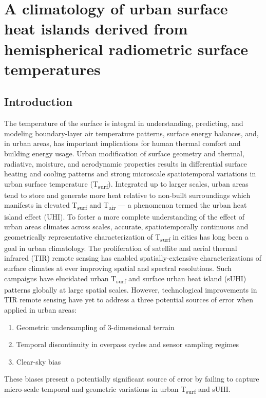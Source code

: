\chapter{A climatology of urban surface heat islands derived from hemispherical radiometric surface temperatures}

\section{Introduction}

The temperature of the surface is integral in understanding, predicting, and modeling boundary-layer air temperature patterns, surface energy balances, and, in urban areas, has important implications for human thermal comfort and building energy usage. Urban modification of surface geometry and thermal, radiative, moisture, and aerodynamic properties results in differential surface heating and cooling patterns and strong microscale spatiotemporal variations in urban surface temperature (T\textsubscript{surf}). Integrated up to larger scales, urban areas tend to store and generate more heat relative to non-built surroundings which manifests in elevated T\textsubscript{surf} and T\textsubscript{air} --- a phenomenon termed the urban heat island effect (UHI). To foster a more complete understanding of the effect of urban areas climates across scales, accurate, spatiotemporally continuous and geometrically representative characterization of T\textsubscript{surf} in cities has long been a goal in urban climatology. The proliferation of satellite and aerial thermal infrared (TIR) remote sensing has enabled spatially-extensive characterizations of surface climates at ever improving spatial and spectral resolutions. Such campaigns have elucidated urban T\textsubscript{surf} and surface urban heat island (sUHI) patterns globally at large spatial scales. However, technological improvements in TIR remote sensing have yet to address a three potential sources of error when applied in urban areas: 

\begin{enumerate}
	\item Geometric undersampling of 3-dimensional terrain
	\item Temporal discontinuity in overpass cycles and sensor sampling regimes
	\item Clear-sky bias
\end{enumerate}

\noindent These biases present a potentially significant source of error by failing to capture micro-scale temporal and geometric variations in urban T\textsubscript{surf} and sUHI. 

